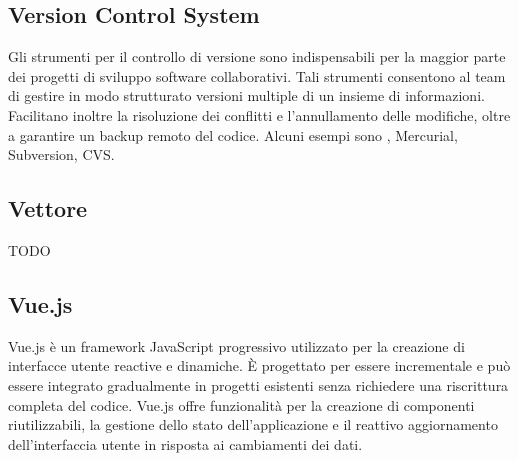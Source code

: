 \vspace{2em}
\subsection*{Version Control System}
Gli strumenti per il controllo di versione sono indispensabili per la maggior parte dei progetti di sviluppo software collaborativi. Tali strumenti consentono al team di gestire in modo strutturato versioni multiple di un insieme di informazioni. Facilitano inoltre la risoluzione dei conflitti e l'annullamento delle modifiche, oltre a garantire un backup remoto del codice.
Alcuni esempi sono , Mercurial, Subversion, CVS.

\vspace{2em}
\subsection*{Vettore}
TODO

\vspace{2em}
\subsection*{Vue.js}
Vue.js è un framework JavaScript progressivo utilizzato per la creazione di interfacce utente reactive e dinamiche. È progettato per essere incrementale e può essere integrato gradualmente in progetti esistenti senza richiedere una riscrittura completa del codice. Vue.js offre funzionalità per la creazione di componenti riutilizzabili, la gestione dello stato dell'applicazione e il reattivo aggiornamento dell'interfaccia utente in risposta ai cambiamenti dei dati.
